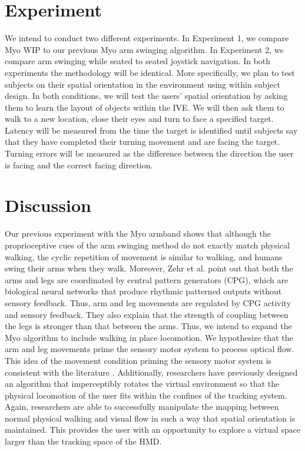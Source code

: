\documentclass{vgtc}                          %
\begin{document}
\section{Experiment}
We intend to conduct two different experiments.
In Experiment 1,  we compare Myo WIP to our previous Myo arm swinging algorithm.
In Experiment 2, we compare arm swinging while seated to seated joystick navigation.
In both experiments the methodology will be identical.
More specifically, we plan to test subjects on their spatial orientation in the environment using within subject design.
In both conditions, we will test the users' spatial orientation by asking them to learn the layout of objects within the IVE.
We will then ask them to walk to a new location, close their eyes and turn to face a specified target.
Latency will be measured from the time the target is identified
until subjects say that they have completed their turning movement and are facing the target.
Turning errors will be measured as the difference between the direction the user is facing and the correct facing direction.



\section{Discussion}
Our previous experiment \cite{previousMYO} with the Myo armband shows that although the
proprioceptive cues of the arm swinging method do not exactly match physical walking,
the cyclic repetition of movement is similar to walking,
and humans swing their arms when they walk.
Moreover, Zehr et al. \cite{zehr} point out that both the arms and legs are coordinated by central pattern generators (CPG),
which are biological neural networks that produce rhythmic patterned outputs without sensory feedback.
Thus, arm and leg movements are regulated
by CPG activity and sensory feedback.
They also explain that the
strength of coupling between the legs is stronger than that between the arms.
Thus, we intend to expand the Myo algorithm to include walking in place locomotion. 
We hypothesize that the arm and leg movements prime the sensory motor system to process optical flow.
This idea of the movement condition priming the sensory motor system is consistent with
the literature \cite{Engel:2008VRST,Nitzsche2004:Presence,Razzaque2001:Eurographics,Steinicke:2010,Williams2006:APGV}.
Additionally, researchers \cite{Engel:2008VRST,Nitzsche2004:Presence,Razzaque2001:Eurographics,Steinicke:2010}
have previously designed an algorithm
that imperceptibly rotates the virtual environment so that the physical locomotion of the user fits within the
confines of the tracking system.
Again, researchers are able to successfully manipulate the mapping between normal physical walking
and visual flow in such a way that spatial orientation is maintained.
This provides the user with an opportunity to explore a virtual space
larger than the tracking space of the HMD.
\end{document}
